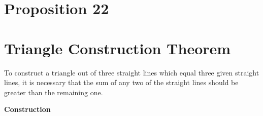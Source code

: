 \documentclass{book}
\begin{document}
\renewcommand\qedsymbol{Q.E.F.}

\section*{Proposition 22}

\section{Triangle Construction Theorem}

\begin{thm}
To construct a triangle out of three straight lines which equal three given straight lines, it is necessary that the sum of any two of the straight lines should be greater than the remaining one.
\end{thm}

\textbf{Construction}
\end{document}
